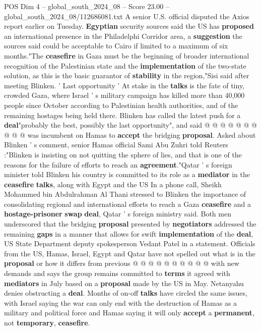 \begin{textsample}{POS Dim 4 – global\_south\_2024\_08 – Score 23.00 – global\_south\_2024\_08/112686081.txt}
A senior U.S. official disputed the Axios report earlier on Tuesday. \textbf{Egyptian} security sources said the US has \textbf{proposed} an international presence in the Philadelphi Corridor area, a \textbf{suggestion} the sources said could be acceptable to Cairo if limited to a maximum of six months."The \textbf{ceasefire} in Gaza must be the beginning of broader international recognition of the Palestinian state and the \textbf{implementation} of the two-state solution, as this is the basic guarantor of \textbf{stability} in the region,"Sisi said after meeting Blinken. ' Last opportunity ' At stake in the \textbf{talks} is the fate of tiny, crowded Gaza, where Israel ' s military campaign has killed more than 40,000 people since October according to Palestinian health authorities, and of the remaining hostages being held there.
Blinken has called the latest push for a \textbf{deal}"probably the best, possibly the last opportunity", and said @ @ @ @ @ @ @ @ @ @ was incumbent on Hamas to \textbf{accept} the bridging \textbf{proposal}.
Asked about Blinken ' s comment, senior Hamas official Sami Abu Zuhri told Reuters :"Blinken is insisting on not quitting the sphere of lies, and that is one of the reasons for the failure of efforts to reach an \textbf{agreement}."Qatar ' s foreign minister told Blinken his country is committed to its role as a \textbf{mediator} in the \textbf{ceasefire} \textbf{talks}, along with Egypt and the US In a phone call, Sheikh Mohammed bin Abdulrahman Al Thani stressed to Blinken the importance of consolidating regional and international efforts to reach a Gaza \textbf{ceasefire} and a \textbf{hostage-prisoner} \textbf{swap} \textbf{deal}, Qatar ' s foreign ministry said.
Both men underscored that the bridging \textbf{proposal} presented by \textbf{negotiators} addressed the remaining \textbf{gaps} in a manner that allows for swift \textbf{implementation} of the \textbf{deal}, US State Department deputy spokesperson Vedant Patel in a statement.
Officials from the US, Hamas, Israel, Egypt and Qatar have not spelled out what is in the \textbf{proposal} or how it differs from previous @ @ @ @ @ @ @ @ @ @ with new demands and says the group remains committed to \textbf{terms} it agreed with \textbf{mediators} in July based on a \textbf{proposal} made by the US in May.
Netanyahu denies obstructing a \textbf{deal}.
Months of on-off \textbf{talks} have circled the same issues, with Israel saying the war can only end with the destruction of Hamas as a military and political force and Hamas saying it will only \textbf{accept} a \textbf{permanent}, not \textbf{temporary}, \textbf{ceasefire}.

\end{textsample}
